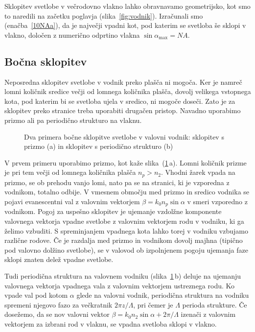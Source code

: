 \begin{remark}
Sklopitev svetlobe v večrodovno vlakno lahko obravnavamo geometrijsko, kot smo to naredili
na začetku poglavja (slika~\ref{fig:vodnik}). Izračunali smo (enačba~\ref{10NAa}), da je največji 
vpadni kot, pod katerim se svetloba še sklopi v vlakno, določen z numerično odprtino 
vlakna $\sin \alpha_{\mathrm{max}}= NA$.
\end{remark}

\subsection*{Bočna sklopitev}
Neposredna sklopitev svetlobe v vodnik preko plašča ni mogoča. Ker je namreč lomni količnik
sredice večji od lomnega količnika plašča, dovolj velikega vstopnega kota, pod katerim bi 
se svetloba ujela v sredico, ni mogoče doseči. Zato je za sklopitev preko stranice treba 
uporabiti drugačen pristop. Navadno uporabimo prizmo ali pa periodično strukturo na vlaknu. 

\begin{figure}[h]
\centering
\def\svgwidth{120truemm} 
 
\caption{Dva primera bočne sklopitve svetlobe v valovni vodnik: sklopitev s prizmo (a) in sklopitev
s periodično strukturo (b)}
\label{fig:coupler}
\end{figure}
V prvem primeru uporabimo prizmo, kot kaže slika~(\ref{fig:coupler}\,a). Lomni količnik prizme
je pri tem večji od lomnega količnika plašča $n_p > n_2$.
Vhodni žarek vpada na prizmo, se ob prehodu vanjo lomi, nato pa se na stranici, ki je vzporedna
z vodnikom, totalno odbije. V vmesnem območju med prizmo in sredico vodnika se pojavi evanescentni
val z valovnim vektorjem $\beta  = k_0 n_p \sin \alpha$ v smeri vzporedno z vodnikom. Pogoj za uspešno 
sklopitev je ujemanje vzdolžne komponente valovnega vektorja vpadne svetlobe z valovnim 
vektorjem rodu v vodniku, ki ga želimo vzbuditi. 
S spreminjanjem vpadnega kota lahko torej v vodniku vzbujamo različne rodove. 
Če je razdalja med prizmo in vodnikom dovolj majhna (tipično pod valovno dolžino svetlobe), se v 
valovod ob izpolnjenem pogoju ujemanja faze sklopi znaten delež vpadne svetlobe.

Tudi periodična struktura na valovnem vodniku (slika~\ref{fig:coupler}\,b) deluje na 
ujemanju valovnega vektorja vpadnega vala z valovnim vektorjem ustreznega rodu.
Ko vpade val pod kotom $\alpha$ glede na valovni vodnik, periodična struktura na vodniku 
spremeni njegovo fazo za večkratnik $2 \pi z/\Lambda$, pri čemer je $\Lambda$ perioda strukture.
Če dosežemo, da se nov valovni vektor $\beta = k_0 n_2 \sin \alpha+ 2 \pi/\Lambda$ izenači z valovnim 
vektorjem za izbrani rod v vlaknu, se vpadna svetloba sklopi v vlakno.

